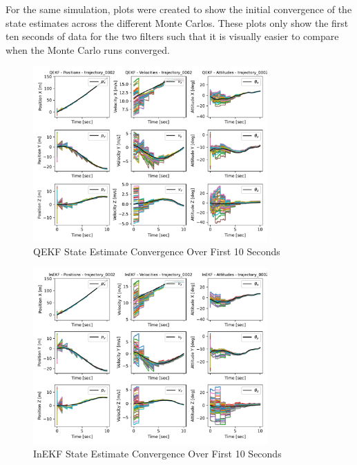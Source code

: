 For the same simulation, plots were created to show the initial convergence of the state estimates across the different Monte Carlos. These plots only show the first ten seconds of data for the two filters such that it is visually  easier to compare when the Monte Carlo runs converged.

\begin{figure}[H]
    \centering
    \includegraphics[width=0.8\textwidth]{figs/QEKF_trajectory_0002_initial_time.pdf}
    \caption{QEKF State Estimate Convergence Over First 10 Seconds}
    \label{fig: QEKF Convergence}
\end{figure}

\begin{figure}[H]
    \centering
    \includegraphics[width=0.8\textwidth]{figs/InEKF_trajectory_0002_initial_time.pdf}
    \caption{InEKF State Estimate Convergence Over First 10 Seconds}
    \label{fig: InEKF Convergence}
\end{figure}

